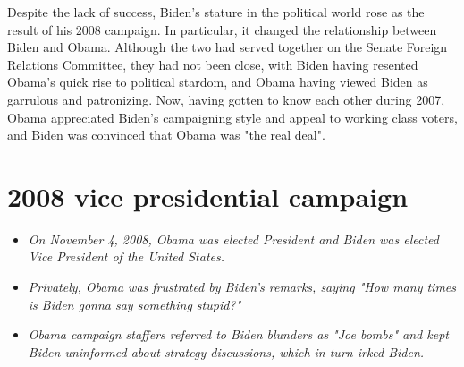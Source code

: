 Despite the lack of success, Biden's stature in the political world rose
as the result of his 2008 campaign. In particular, it changed the
relationship between Biden and Obama. Although the two had served
together on the Senate Foreign Relations Committee, they had not been
close, with Biden having resented Obama's quick rise to political
stardom, and Obama having viewed Biden as garrulous and patronizing.
Now, having gotten to know each other during 2007, Obama appreciated
Biden's campaigning style and appeal to working class voters, and Biden
was convinced that Obama was "the real deal".

\section{2008 vice presidential
campaign}\label{vice-presidential-campaign}

\begin{itemize}
\item
  \emph{On November 4, 2008, Obama was elected President and Biden was
  elected Vice President of the United States.}
\item
  \emph{Privately, Obama was frustrated by Biden's remarks, saying "How
  many times is Biden gonna say something stupid?"}
\item
  \emph{Obama campaign staffers referred to Biden blunders as "Joe
  bombs" and kept Biden uninformed about strategy discussions, which in
  turn irked Biden.}
\end{itemize}

